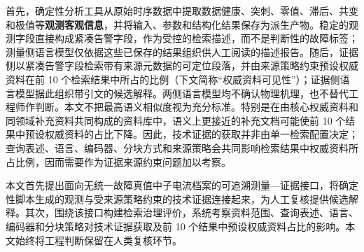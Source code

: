 首先，确定性分析工具从原始时序数据中提取数据健康、突刺、零值、滞后、共变和极值等\textbf{观测客观信息}，并将输入、参数和结构化结果保存为派生产物。稳定的观测字段直接构成紧凑告警字段，作为受控的检索描述，而不是判断性的故障标签；测量侧语言模型仅依据这些已保存的结果组织供人工阅读的描述报告。随后，证据侧以紧凑告警字段检索带有来源元数据的可定位段落，并由来源策略约束预设权威资料在前 10 个检索结果中所占的比例（下文简称“权威资料可见性”）；证据侧语言模型据此组织带引文的候选解释。两侧语言模型均不确认物理机理，也不替代工程师作判断。本文不把最高语义相似度视为充分标准。特别是在由核心权威资料和同领域补充资料共同构成的资料库中，语义上更接近的补充文档可能使前 10 个结果中预设权威资料的占比下降。因此，技术证据的获取并非由单一检索配置决定；查询表述、语言、编码器、分块方式和来源策略会共同影响检索结果中权威资料所占比例，因而需要作为证据来源约束问题加以考察。

本文首先提出面向无统一故障真值中子电流档案的可追溯测量—证据接口，将确定性脚本生成的观测与受来源策略约束的技术证据连接起来，为人工复核提供候选解释。其次，围绕该接口构建检索治理评价，系统考察资料范围、查询表述、语言、编码器和分块策略对技术证据获取及前 10 个结果中预设权威资料占比的影响。本文始终将工程判断保留在人类复核环节。
